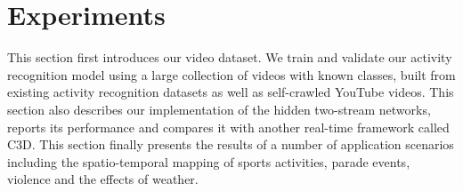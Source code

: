 \documentclass[sigconf]{acmart}
\begin{document}
	\begin{table}[t]
		\begin{center}
			\vspace{2ex}
			\caption{Per-class accuracy on the validation dataset. \label{tab:break_down}}
			\vspace{-4ex}
		\end{center}
	\end{table} 
	
	\section{Experiments}
	\label{sec:experiments}
	This section first introduces our video dataset. 
	We train and validate our activity recognition model using a large collection of videos with known classes, built from existing activity recognition datasets as well as self-crawled YouTube videos. 
	This section also describes our implementation of the hidden two-stream networks, reports its performance and compares it with another real-time framework called C3D. This section finally presents the results of a number of application scenarios including the spatio-temporal mapping of sports activities, parade events, violence and the effects of weather.
	
\end{document}
